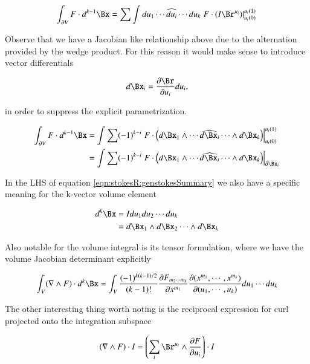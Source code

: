 \begin{equation}
\int_{\partial V} F \cdot d^{k-1}\Bx 
= \sum \int du_1 \cdots \widehat{du_i} \cdots du_k \left.{F \cdot (I \Br^{u_i})}\right\vert_{u_i(0)}^{u_i(1)} \\
\end{equation}

Observe that we have a Jacobian like relationship above due to the alternation provided by the wedge product.  For this
reason it would make sense to introduce vector differentials

\begin{equation}
d\Bx_i = \PD{u_i}{\Br} du_i,
\end{equation}

in order to suppress the explicit parametrization.

\begin{align}
\int_{\partial V} F \cdot d^{k-1}\Bx 
&=
 \int \sum (-1)^{k-i}
\left.{F \cdot 
\left( d\Bx_1 \wedge \cdots \widehat{d\Bx_i} \cdots \wedge d\Bx_k \right)
}\right\vert_{u_i(0)}^{u_i(1)} \\
&=
\int \sum (-1)^{k-i}
\left.{F \cdot 
\left( d\Bx_1 \wedge \cdots \widehat{d\Bx_i} \cdots \wedge d\Bx_k \right)
}\right\vert_{\partial \Bx_i}
\end{align}

In the LHS of equation \ref{eqn:stokesR:genstokesSummary} we also have a specific meaning for the k-vector volume element

\begin{align}
d^{k}\Bx 
&= I du_1 du_2 \cdots du_k \\
&= d\Bx_1 \wedge d\Bx_2 \cdots \wedge d\Bx_k
\end{align}

Also notable for the volume integral is its tensor formulation, where we have the volume Jacobian determinant explicitly

\begin{equation}
\int_V (\grad \wedge F) \cdot d^{k}\Bx 
= \int_V
\frac{(-1)^{k(k-1)/2}}{(k-1)!} 
\PD{x^{m_{1}}}{F_{m_2 \cdots m_{k}}}
\frac{\partial( x^{m_1}, \cdots, x^{m_k} )}{\partial( u_1, \cdots, u_k )} du_1 \cdots du_k
\end{equation}

The other interesting thing worth noting is the reciprocal expression for curl projected onto the integration subspace

\begin{equation}
(\grad \wedge F) \cdot I = \left( \sum_i \Br^{u_i} \wedge \PD{u_i}{F} \right) \cdot I 
\end{equation}

